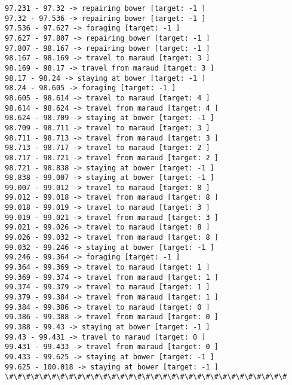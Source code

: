 \documentclass[11pt]{article}
\begin{document}
\begin{Verbatim}[commandchars=\\\{\}]
97.231 - 97.32 -> repairing bower [target: -1 ]
97.32 - 97.536 -> repairing bower [target: -1 ]
97.536 - 97.627 -> foraging [target: -1 ]
97.627 - 97.807 -> repairing bower [target: -1 ]
97.807 - 98.167 -> repairing bower [target: -1 ]
98.167 - 98.169 -> travel to maraud [target: 3 ]
98.169 - 98.17 -> travel from maraud [target: 3 ]
98.17 - 98.24 -> staying at bower [target: -1 ]
98.24 - 98.605 -> foraging [target: -1 ]
98.605 - 98.614 -> travel to maraud [target: 4 ]
98.614 - 98.624 -> travel from maraud [target: 4 ]
98.624 - 98.709 -> staying at bower [target: -1 ]
98.709 - 98.711 -> travel to maraud [target: 3 ]
98.711 - 98.713 -> travel from maraud [target: 3 ]
98.713 - 98.717 -> travel to maraud [target: 2 ]
98.717 - 98.721 -> travel from maraud [target: 2 ]
98.721 - 98.838 -> staying at bower [target: -1 ]
98.838 - 99.007 -> staying at bower [target: -1 ]
99.007 - 99.012 -> travel to maraud [target: 8 ]
99.012 - 99.018 -> travel from maraud [target: 8 ]
99.018 - 99.019 -> travel to maraud [target: 3 ]
99.019 - 99.021 -> travel from maraud [target: 3 ]
99.021 - 99.026 -> travel to maraud [target: 8 ]
99.026 - 99.032 -> travel from maraud [target: 8 ]
99.032 - 99.246 -> staying at bower [target: -1 ]
99.246 - 99.364 -> foraging [target: -1 ]
99.364 - 99.369 -> travel to maraud [target: 1 ]
99.369 - 99.374 -> travel from maraud [target: 1 ]
99.374 - 99.379 -> travel to maraud [target: 1 ]
99.379 - 99.384 -> travel from maraud [target: 1 ]
99.384 - 99.386 -> travel to maraud [target: 0 ]
99.386 - 99.388 -> travel from maraud [target: 0 ]
99.388 - 99.43 -> staying at bower [target: -1 ]
99.43 - 99.431 -> travel to maraud [target: 0 ]
99.431 - 99.433 -> travel from maraud [target: 0 ]
99.433 - 99.625 -> staying at bower [target: -1 ]
99.625 - 100.018 -> staying at bower [target: -1 ]
\#\#\#\#\#\#\#\#\#\#\#\#\#\#\#\#\#\#\#\#\#\#\#\#\#\#\#\#\#\#\#\#\#



    \end{Verbatim}


    
    
    
    
\end{document}
